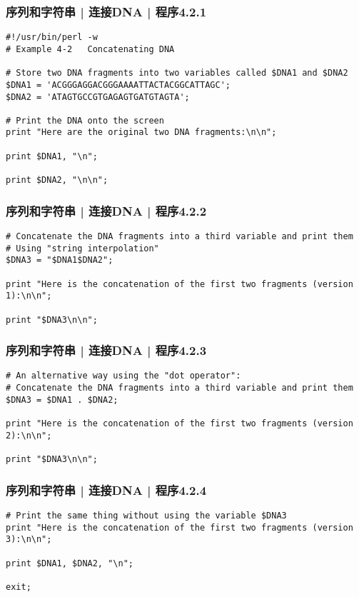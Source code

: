 \begin{frame}[fragile,label=exam4.2.1]
  \frametitle{序列和字符串 | 连接DNA | 程序4.2.1}
\begin{lstlisting}
#!/usr/bin/perl -w
# Example 4-2   Concatenating DNA

# Store two DNA fragments into two variables called $DNA1 and $DNA2
$DNA1 = 'ACGGGAGGACGGGAAAATTACTACGGCATTAGC';
$DNA2 = 'ATAGTGCCGTGAGAGTGATGTAGTA';

# Print the DNA onto the screen
print "Here are the original two DNA fragments:\n\n";

print $DNA1, "\n";

print $DNA2, "\n\n";
\end{lstlisting}
\end{frame}

\begin{frame}[fragile,label=exam4.2.2]
  \frametitle{序列和字符串 | 连接DNA | 程序4.2.2}
\begin{lstlisting}[firstnumber=15]
# Concatenate the DNA fragments into a third variable and print them
# Using "string interpolation"
$DNA3 = "$DNA1$DNA2";

print "Here is the concatenation of the first two fragments (version 1):\n\n";

print "$DNA3\n\n";
\end{lstlisting}
\end{frame}

\begin{frame}[fragile,label=exam4.2.3]
  \frametitle{序列和字符串 | 连接DNA | 程序4.2.3}
\begin{lstlisting}[firstnumber=23]
# An alternative way using the "dot operator":
# Concatenate the DNA fragments into a third variable and print them
$DNA3 = $DNA1 . $DNA2;

print "Here is the concatenation of the first two fragments (version 2):\n\n";

print "$DNA3\n\n";
\end{lstlisting}
\end{frame}

\begin{frame}[fragile,label=exam4.2.4]
  \frametitle{序列和字符串 | 连接DNA | 程序4.2.4}
\begin{lstlisting}[firstnumber=31]
# Print the same thing without using the variable $DNA3
print "Here is the concatenation of the first two fragments (version 3):\n\n";

print $DNA1, $DNA2, "\n";

exit;
\end{lstlisting}
\end{frame}

